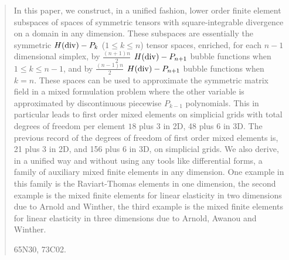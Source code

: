 \documentclass{amsart}
\numberwithin{table}{section}
\numberwithin{figure}{section}
\begin{document}
\begin{abstract}
  \vskip 15pt
In this paper, we  construct, in a unified  fashion,
lower order finite element subspaces of  spaces of symmetric
tensors with square-integrable divergence on a  domain in any dimension.
These subspaces are essentially the symmetric $H(\d)-P_{k}$ ($1\leq k\leq n$)
 tensor spaces, enriched, for each  $n-1$ dimensional simplex,
 by  $\frac{(n+1)n}{2}$ $H(\d)-P_{n+1}$  bubble functions when
 $1\leq k\leq  n-1$, and by  $\frac{(n-1)n}{2}$ $H(\d)-P_{n+1}$  bubble functions when
 $k= n$.  These spaces can be used to approximate the symmetric matrix
  field in a mixed formulation problem where the  other variable is approximated by
    discontinuous piecewise $P_{k-1}$ polynomials.   This in particular leads to first order mixed elements on  simplicial grids  with
 total degrees of freedom per element $18$ plus $3$ in 2D, 48 plus 6 in 3D.
    The previous record of  the degrees  of freedom of first order mixed elements  is,
      21 plus 3 in 2D, and   156 plus 6 in 3D, on  simplicial grids.
   We  also derive, in a unified way and without using any tools like differential forms,
  a family of auxiliary mixed finite elements in any dimension. One  example in
   this family is the Raviart-Thomas elements     in one dimension, the second
    example is   the mixed finite elements  for linear elasticity in two dimensions due to
   Arnold and  Winther,  the third   example is the mixed finite elements for linear elasticity
    in three dimensions due to Arnold, Awanou and Winther.


 \vskip 15pt

    { 65N30, 73C02.}


\end{abstract}
\maketitle
\end{document}

